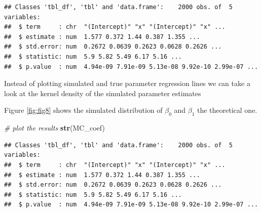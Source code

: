 \documentclass[]{book}
\newenvironment{Shaded}{\begin{snugshade}}{\end{snugshade}}
\newcommand{\CommentTok}[1]{\textcolor[rgb]{0.56,0.35,0.01}{\textit{#1}}}
\newcommand{\DataTypeTok}[1]{\textcolor[rgb]{0.13,0.29,0.53}{#1}}
\newcommand{\KeywordTok}[1]{\textcolor[rgb]{0.13,0.29,0.53}{\textbf{#1}}}
\newcommand{\NormalTok}[1]{#1}
\newcommand{\OperatorTok}[1]{\textcolor[rgb]{0.81,0.36,0.00}{\textbf{#1}}}
\newcommand{\StringTok}[1]{\textcolor[rgb]{0.31,0.60,0.02}{#1}}
\begin{document}
\begin{verbatim}
## Classes 'tbl_df', 'tbl' and 'data.frame':    2000 obs. of  5 variables:
##  $ term     : chr  "(Intercept)" "x" "(Intercept)" "x" ...
##  $ estimate : num  1.577 0.372 1.44 0.387 1.355 ...
##  $ std.error: num  0.2672 0.0639 0.2623 0.0628 0.2626 ...
##  $ statistic: num  5.9 5.82 5.49 6.17 5.16 ...
##  $ p.value  : num  4.94e-09 7.91e-09 5.13e-08 9.92e-10 2.99e-07 ...
\end{verbatim}

Instead of plotting simulated and true parameter regression lines we can
take a look at the kernel density of the simulated parameter estimates

Figure \ref{fig:fig8} shows the simulated distribution of \(\beta_{0}\)
and \(\beta_{1}\) the theoretical one.

\begin{Shaded}
\begin{Highlighting}[]
\CommentTok{# plot the results}
\KeywordTok{str}\NormalTok{(MC_coef)}
\end{Highlighting}
\end{Shaded}

\begin{verbatim}
## Classes 'tbl_df', 'tbl' and 'data.frame':    2000 obs. of  5 variables:
##  $ term     : chr  "(Intercept)" "x" "(Intercept)" "x" ...
##  $ estimate : num  1.577 0.372 1.44 0.387 1.355 ...
##  $ std.error: num  0.2672 0.0639 0.2623 0.0628 0.2626 ...
##  $ statistic: num  5.9 5.82 5.49 6.17 5.16 ...
##  $ p.value  : num  4.94e-09 7.91e-09 5.13e-08 9.92e-10 2.99e-07 ...
\end{verbatim}

\begin{Shaded}
\end{Shaded}
\end{document}
